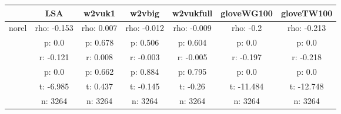 \documentclass{article}
\begin{document}
\begin{tabular}{ccccccc|}\cline{2-7}
&\multicolumn{1}{|c}{LSA} & w2vuk1 & w2vbig & w2vukfull & gloveWG100 & gloveTW100 \\\hline
\multicolumn{1}{|c|}{\multirow{6}{*}{norel}} & rho: -0.153 & rho: 0.007 & rho: -0.012 & rho: -0.009 & rho: -0.2 & rho: -0.213 \\
\multicolumn{1}{|c|}{} & p: 0.0 & p: 0.678 & p: 0.506 & p: 0.604 & p: 0.0 & p: 0.0 \\
\multicolumn{1}{|c|}{} & r: -0.121 & r: 0.008 & r: -0.003 & r: -0.005 & r: -0.197 & r: -0.218 \\
\multicolumn{1}{|c|}{} & p: 0.0 & p: 0.662 & p: 0.884 & p: 0.795 & p: 0.0 & p: 0.0 \\
\multicolumn{1}{|c|}{} & t: -6.985 & t: 0.437 & t: -0.145 & t: -0.26 & t: -11.484 & t: -12.748 \\
\multicolumn{1}{|c|}{} & n: 3264 & n: 3264 & n: 3264 & n: 3264 & n: 3264 & n: 3264 \\
\hline
\end{tabular}\\
\end{document}
